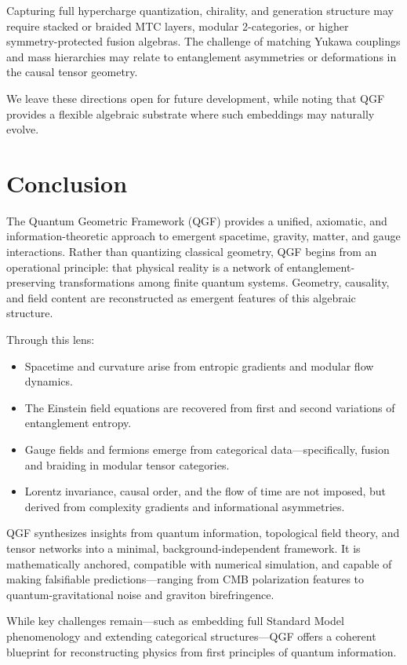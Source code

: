 \documentclass[11pt]{article}
\begin{document}
Capturing full hypercharge quantization, chirality, and generation structure may require stacked or braided MTC layers, modular 2-categories, or higher symmetry-protected fusion algebras. The challenge of matching Yukawa couplings and mass hierarchies may relate to entanglement asymmetries or deformations in the causal tensor geometry.

We leave these directions open for future development, while noting that QGF provides a flexible algebraic substrate where such embeddings may naturally evolve.



\section{Conclusion}

The Quantum Geometric Framework (QGF) provides a unified, axiomatic, and information-theoretic approach to emergent spacetime, gravity, matter, and gauge interactions. Rather than quantizing classical geometry, QGF begins from an operational principle: that physical reality is a network of entanglement-preserving transformations among finite quantum systems. Geometry, causality, and field content are reconstructed as emergent features of this algebraic structure.

Through this lens:
\begin{itemize}
    \item Spacetime and curvature arise from entropic gradients and modular flow dynamics.
    \item The Einstein field equations are recovered from first and second variations of entanglement entropy.
    \item Gauge fields and fermions emerge from categorical data—specifically, fusion and braiding in modular tensor categories.
    \item Lorentz invariance, causal order, and the flow of time are not imposed, but derived from complexity gradients and informational asymmetries.
\end{itemize}

QGF synthesizes insights from quantum information, topological field theory, and tensor networks into a minimal, background-independent framework. It is mathematically anchored, compatible with numerical simulation, and capable of making falsifiable predictions—ranging from CMB polarization features to quantum-gravitational noise and graviton birefringence.

While key challenges remain—such as embedding full Standard Model phenomenology and extending categorical structures—QGF offers a coherent blueprint for reconstructing physics from first principles of quantum information.
\end{document}
